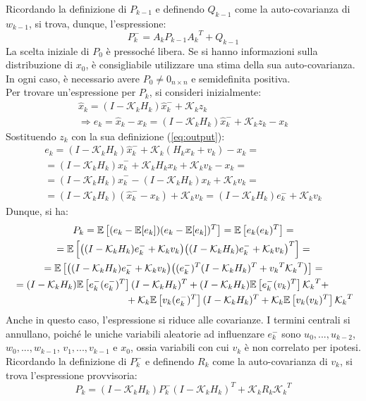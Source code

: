 \documentclass[12pt,a4paper,openright,twoside]{book}
\begin{document}
Ricordando la definizione di $P_{k-1}$ e definendo $Q_{k-1}$ come la auto-covarianza di $w_{k-1}$, si trova, dunque, l'espressione:
$$P_k^-=A_kP_{k-1}{A_k}^T+Q_{k-1}$$
La scelta iniziale di $P_0$ è pressoché libera. Se si hanno informazioni sulla distribuzione di $x_0$, è consigliabile utilizzare una stima della sua auto-covarianza. In ogni caso, è necessario avere $P_0\neq 0_{n\times n}$ e semidefinita positiva. \\

Per trovare un'espressione per $P_k$, si consideri inizialmente:
\begin{gather*}
\hat{x}_k=(I-\mathcal{K}_kH_k)\hat{x}_k^-+\mathcal{K}_kz_k \\
\Rightarrow e_k=\hat{x}_k-x_k=(I-\mathcal{K}_kH_k)\hat{x}_k^-+\mathcal{K}_kz_k-x_k
\end{gather*}
Sostituendo $z_k$ con la sua definizione (\ref{eq:output}):
\begin{gather*}
e_k=(I-\mathcal{K}_kH_k)\hat{x}_k^-+\mathcal{K}_k(H_kx_k+v_k)-x_k= \\
=(I-\mathcal{K}_kH_k)\hat{x}_k^-+\mathcal{K}_kH_kx_k+\mathcal{K}_kv_k-x_k= \\
=(I-\mathcal{K}_kH_k)\hat{x}_k^--(I-\mathcal{K}_kH_k)x_k+\mathcal{K}_kv_k= \\
=(I-\mathcal{K}_kH_k)(\hat{x}_k^--x_k)+\mathcal{K}_kv_k=(I-\mathcal{K}_kH_k)e_k^-+\mathcal{K}_kv_k
\end{gather*}
Dunque, si ha:
\begin{gather*}
P_k=\mathbb{E}\left[(e_k-\mathbb{E}[e_k])(e_k-\mathbb{E}[e_k])^T\right]=\mathbb{E}\left[e_k(e_k)^T\right]= \\
=\mathbb{E}\left[\bigl((I-\mathcal{K}_kH_k)e_k^-+\mathcal{K}_kv_k\bigr)\bigl((I-\mathcal{K}_kH_k)e_k^-+\mathcal{K}_kv_k\bigr)^T\right]= \\
=\mathbb{E}\left[\bigl((I-\mathcal{K}_kH_k)e_k^-+\mathcal{K}_kv_k\bigr)\bigl((e_k^-)^T(I-\mathcal{K}_kH_k)^T+{v_k}^T{\mathcal{K}_k}^T\bigr)\right]= \\
\begin{multlined}[\textwidth]
=(I-\mathcal{K}_kH_k)\mathbb{E}\left[e_k^-(e_k^-)^T\right](I-\mathcal{K}_kH_k)^T+(I-\mathcal{K}_kH_k)\mathbb{E}\left[e_k^-(v_k)^T\right]{\mathcal{K}_k}^T+ \\
+\mathcal{K}_k\mathbb{E}\left[v_k(e_k^-)^T\right](I-\mathcal{K}_kH_k)^T+\mathcal{K}_k\mathbb{E}\left[v_k(v_k)^T\right]{\mathcal{K}_k}^T
\end{multlined}
\end{gather*}
Anche in questo caso, l'espressione si riduce alle covarianze. I termini centrali si annullano, poiché le uniche variabili aleatorie ad influenzare $e_k^-$ sono $u_0,...,u_{k-2}$, $w_0,...,w_{k-1}$, $v_1,...,v_{k-1}$ e $x_0$, ossia variabili con cui $v_k$ è non correlato per ipotesi. \\
Ricordando la definizione di $P_k^-$ e definendo $R_k$ come la auto-covarianza di $v_k$, si trova l'espressione provvisoria:
$$P_k=(I-\mathcal{K}_kH_k)P_k^-(I-\mathcal{K}_kH_k)^T+\mathcal{K}_kR_k{\mathcal{K}_k}^T$$
\end{document}
